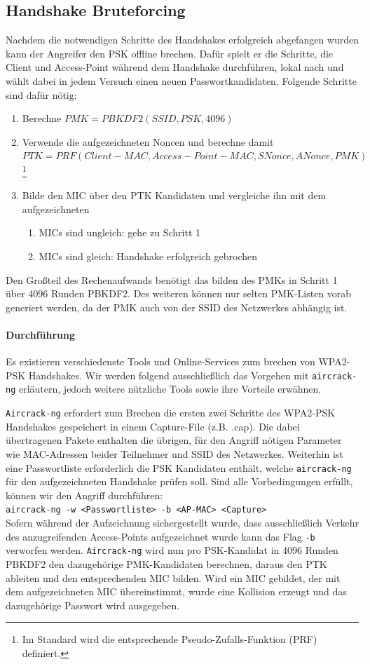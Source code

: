 \subsection{Handshake Bruteforcing}
Nachdem die notwendigen Schritte des Handshakes erfolgreich abgefangen wurden kann der Angreifer den PSK offline brechen.
Dafür spielt er die Schritte, die Client und Access-Point während dem Handshake durchführen, lokal nach und wählt dabei in jedem Versuch einen neuen Passwortkandidaten.
Folgende Schritte sind dafür nötig:
\begin{enumerate}
	\item Berechne $PMK = PBKDF2(SSID, PSK, 4096)$
	\item Verwende die aufgezeichneten Noncen und berechne damit \\$PTK = PRF(Client-MAC, Access-Point-MAC, SNonce, ANonce, PMK)$\footnote{Im Standard wird die entsprechende Pseudo-Zufalls-Funktion (PRF) definiert.}
	\item Bilde den MIC über den PTK Kandidaten und vergleiche ihn mit dem aufgezeichneten
	\begin{enumerate}
		\item MICs sind ungleich: gehe zu Schritt 1
		\item MICs sind gleich: Handshake erfolgreich gebrochen
	\end{enumerate}
\end{enumerate}
Den Großteil des Rechenaufwands benötigt das bilden des PMKs in Schritt 1 über 4096 Runden PBKDF2.
Des weiteren können nur selten PMK-Listen vorab generiert werden, da der PMK auch von der SSID des Netzwerkes abhängig ist.

\paragraph{Durchführung}
Es existieren verschiedenste Tools und Online-Services zum brechen von WPA2-PSK Handshakes.
Wir werden folgend ausschließlich das Vorgehen mit \texttt{aircrack-ng} erläutern, jedoch weitere nützliche Tools sowie ihre Vorteile erwähnen.

\texttt{Aircrack-ng} erfordert zum Brechen die ersten zwei Schritte des WPA2-PSK Handshakes gespeichert in einem Capture-File (z.B. .cap).
Die dabei übertragenen Pakete enthalten die übrigen, für den Angriff nötigen Parameter wie MAC-Adressen beider Teilnehmer und SSID des Netzwerkes.
Weiterhin ist eine Passwortliste erforderlich die PSK Kandidaten enthält, welche \texttt{aircrack-ng} für den aufgezeichneten Handshake prüfen soll.
Sind alle Vorbedingungen erfüllt, können wir den Angriff durchführen:
\\\texttt{aircrack-ng -w <Passwortliste> -b <AP-MAC> <Capture>}\\
Sofern während der Aufzeichnung sichergestellt wurde, dass ausschließlich Verkehr des anzugreifenden Access-Points aufgezeichnet wurde kann das Flag \texttt{-b} verworfen werden.
\texttt{Aircrack-ng} wird nun pro PSK-Kandidat in 4096 Runden PBKDF2 den dazugehörige PMK-Kandidaten berechnen, daraus den PTK ableiten und den entsprechenden MIC bilden.
Wird ein MIC gebildet, der mit dem aufgezeichneten MIC übereinstimmt, wurde eine Kollision erzeugt und das dazugehörige Passwort wird ausgegeben.

